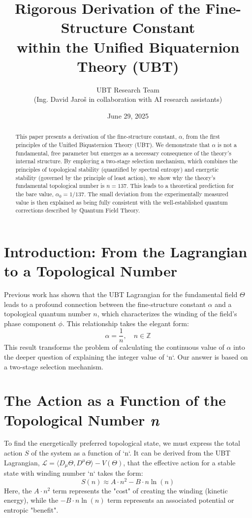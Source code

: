 \documentclass[12pt, a4paper]{article}
\title{Rigorous Derivation of the Fine-Structure Constant \\ within the Unified Biquaternion Theory (UBT)}
\author{UBT Research Team \\ \small(Ing. David Jaroš in collaboration with AI research assistants)}
\date{June 29, 2025}
\begin{document}
\maketitle

\begin{abstract}
This paper presents a derivation of the fine-structure constant, \( \alpha \), from the first principles of the Unified Biquaternion Theory (UBT). We demonstrate that \( \alpha \) is not a fundamental, free parameter but emerges as a necessary consequence of the theory's internal structure. By employing a two-stage selection mechanism, which combines the principles of topological stability (quantified by spectral entropy) and energetic stability (governed by the principle of least action), we show why the theory's fundamental topological number is \( n=137 \). This leads to a theoretical prediction for the bare value, \( \alpha_0 = 1/137 \). The small deviation from the experimentally measured value is then explained as being fully consistent with the well-established quantum corrections described by Quantum Field Theory.
\end{abstract}

\section{Introduction: From the Lagrangian to a Topological Number}

Previous work has shown that the UBT Lagrangian for the fundamental field \( \Theta \) leads to a profound connection between the fine-structure constant \( \alpha \) and a topological quantum number \( n \), which characterizes the winding of the field's phase component \( \phi \). This relationship takes the elegant form:
\begin{equation}
    \alpha = \frac{1}{n}, \quad n \in \mathbb{Z}
\end{equation}
This result transforms the problem of calculating the continuous value of \( \alpha \) into the deeper question of explaining the integer value of `n`. Our answer is based on a two-stage selection mechanism.

\section{The Action as a Function of the Topological Number \textit{n}}

To find the energetically preferred topological state, we must express the total action \( S \) of the system as a function of `n`. It can be derived from the UBT Lagrangian, \( \mathcal{L} = \langle D_\mu \Theta, D^\mu \Theta \rangle - V(\Theta) \), that the effective action for a stable state with winding number `n` takes the form:
\begin{equation}
    S(n) \approx A \cdot n^2 - B \cdot n \ln(n)
    \label{eq:action}
\end{equation}
Here, the \( A \cdot n^2 \) term represents the "cost" of creating the winding (kinetic energy), while the \( -B \cdot n \ln(n) \) term represents an associated potential or entropic "benefit".
\end{document}
